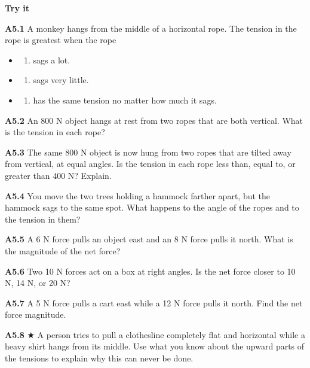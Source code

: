 \documentclass[
]{article}
\providecommand{\tightlist}{%
  \setlength{\itemsep}{0pt}\setlength{\parskip}{0pt}}
\begin{document}
\textbf{Try it}

\textbf{A5.1} A monkey hangs from the middle of a horizontal rope. The
tension in the rope is greatest when the rope

\begin{itemize}
\tightlist
\item
  \begin{enumerate}
  \def\labelenumi{\Alph{enumi})}
  \tightlist
  \item
    sags a lot.
  \end{enumerate}
\item
  \begin{enumerate}
  \def\labelenumi{\Alph{enumi})}
  \setcounter{enumi}{1}
  \tightlist
  \item
    sags very little.
  \end{enumerate}
\item
  \begin{enumerate}
  \def\labelenumi{\Alph{enumi})}
  \setcounter{enumi}{2}
  \tightlist
  \item
    has the same tension no matter how much it sags.
  \end{enumerate}
\end{itemize}

\textbf{A5.2} An 800 N object hangs at rest from two ropes that are both
vertical. What is the tension in each rope?

\textbf{A5.3} The same 800 N object is now hung from two ropes that are
tilted away from vertical, at equal angles. Is the tension in each rope
less than, equal to, or greater than 400 N? Explain.

\textbf{A5.4} You move the two trees holding a hammock farther apart,
but the hammock sags to the same spot. What happens to the angle of the
ropes and to the tension in them?

\textbf{A5.5} A 6 N force pulls an object east and an 8 N force pulls it
north. What is the magnitude of the net force?

\textbf{A5.6} Two 10 N forces act on a box at right angles. Is the net
force closer to 10 N, 14 N, or 20 N?

\textbf{A5.7} A 5 N force pulls a cart east while a 12 N force pulls it
north. Find the net force magnitude.

\textbf{A5.8} ★ A person tries to pull a clothesline completely flat and
horizontal while a heavy shirt hangs from its middle. Use what you know
about the upward parts of the tensions to explain why this can never be
done.
\end{document}

